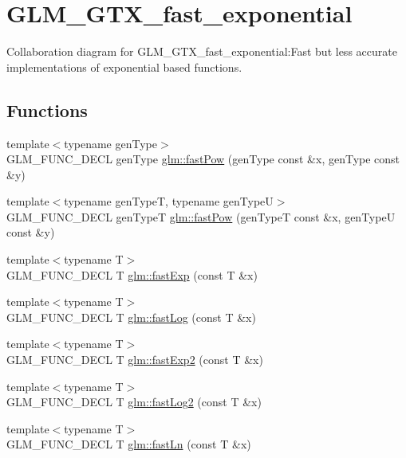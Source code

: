 \hypertarget{group__gtx__fast__exponential}{
\section{GLM\_\-GTX\_\-fast\_\-exponential}
\label{group__gtx__fast__exponential}
}


Collaboration diagram for GLM\_\-GTX\_\-fast\_\-exponential:Fast but less accurate implementations of exponential based functions.  
\subsection*{Functions}
\begin{CompactItemize}
\item 
{\footnotesize template$<$typename genType$>$ }\\GLM\_\-FUNC\_\-DECL genType \hyperlink{group__gtx__fast__exponential_g399b134d7015729817135440eb047d5a}{glm::fastPow} (genType const \&x, genType const \&y)
\item 
{\footnotesize template$<$typename genTypeT, typename genTypeU$>$ }\\GLM\_\-FUNC\_\-DECL genTypeT \hyperlink{group__gtx__fast__exponential_g1cbcbe8fc0fd21f221cfc10104a3a773}{glm::fastPow} (genTypeT const \&x, genTypeU const \&y)
\item 
{\footnotesize template$<$typename T$>$ }\\GLM\_\-FUNC\_\-DECL T \hyperlink{group__gtx__fast__exponential_g40d33b6bb8287eac031ee6226f1e2285}{glm::fastExp} (const T \&x)
\item 
{\footnotesize template$<$typename T$>$ }\\GLM\_\-FUNC\_\-DECL T \hyperlink{group__gtx__fast__exponential_g8f05b41fb9e7991a5a73f6d4a281d3f3}{glm::fastLog} (const T \&x)
\item 
{\footnotesize template$<$typename T$>$ }\\GLM\_\-FUNC\_\-DECL T \hyperlink{group__gtx__fast__exponential_g4279c1c329936c70e919a1d11e6125e3}{glm::fastExp2} (const T \&x)
\item 
{\footnotesize template$<$typename T$>$ }\\GLM\_\-FUNC\_\-DECL T \hyperlink{group__gtx__fast__exponential_gb7e579d5f2bf90e6b68baf3071a5c4a8}{glm::fastLog2} (const T \&x)
\item 
{\footnotesize template$<$typename T$>$ }\\GLM\_\-FUNC\_\-DECL T \hyperlink{group__gtx__fast__exponential_g5ffa4e8267716faa2e164a6e0a7335fe}{glm::fastLn} (const T \&x)
\end{CompactItemize}



